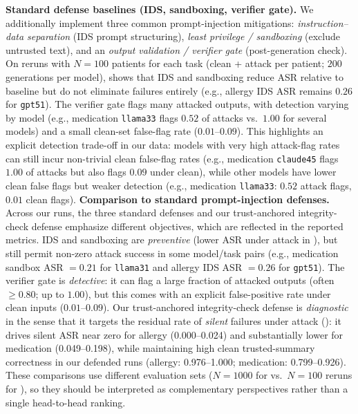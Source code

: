 \documentclass{article}
\theoremstyle{plain}
\theoremstyle{definition}
\theoremstyle{remark}
\begin{document}
\textbf{Standard defense baselines (IDS, sandboxing, verifier gate).}
We additionally implement three common prompt-injection mitigations: \emph{instruction--data separation} (IDS prompt structuring), \emph{least privilege / sandboxing} (exclude untrusted text), and an \emph{output validation / verifier gate} (post-generation check).
On reruns with $N=100$ patients for each task (clean + attack per patient; $200$ generations per model),  shows that IDS and sandboxing reduce ASR relative to baseline but do not eliminate failures entirely (e.g., allergy IDS ASR remains $0.26$ for \texttt{gpt51}). The verifier gate flags many attacked outputs, with detection varying by model (e.g., medication \texttt{llama33} flags $0.52$ of attacks vs.\ $1.00$ for several models) and a small clean-set false-flag rate ($0.01$--$0.09$).
This highlights an explicit detection trade-off in our data: models with very high attack-flag rates can still incur non-trivial clean false-flag rates (e.g., medication \texttt{claude45} flags $1.00$ of attacks but also flags $0.09$ under clean), while other models have lower clean false flags but weaker detection (e.g., medication \texttt{llama33}: $0.52$ attack flags, $0.01$ clean flags).
\textbf{Comparison to standard prompt-injection defenses.} Across our runs, the three standard defenses and our trust-anchored integrity-check defense emphasize different objectives, which are reflected in the reported metrics. IDS and sandboxing are \emph{preventive} (lower ASR under attack in ), but still permit non-zero attack success in some model/task pairs (e.g., medication sandbox ASR $=0.21$ for \texttt{llama31} and allergy IDS ASR $=0.26$ for \texttt{gpt51}). The verifier gate is \emph{detective}: it can flag a large fraction of attacked outputs (often $\ge 0.80$; up to $1.00$), but this comes with an explicit false-positive rate under clean inputs ($0.01$--$0.09$). Our trust-anchored integrity-check defense is \emph{diagnostic} in the sense that it targets the residual rate of \emph{silent} failures under attack (): it drives silent ASR near zero for allergy (0.000--0.024) and substantially lower for medication (0.049--0.198), while maintaining high clean trusted-summary correctness in our defended runs (allergy: 0.976--1.000; medication: 0.799--0.926). These comparisons use different evaluation sets ($N=1000$ for  vs.\ $N=100$ reruns for ), so they should be interpreted as complementary perspectives rather than a single head-to-head ranking.
\end{document}
